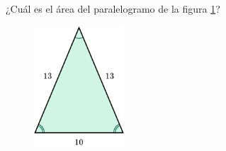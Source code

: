¿Cuál es el \'area del paralelogramo de la figura \ref{fig:area_isoseles_02}?
\begin{figure}[H]
    \begin{center}
        \includegraphics[width=0.3\textwidth]{../images/area_isoseles_02.png}
    \end{center}
    \caption{}
    \label{fig:area_isoseles_02}
\end{figure}